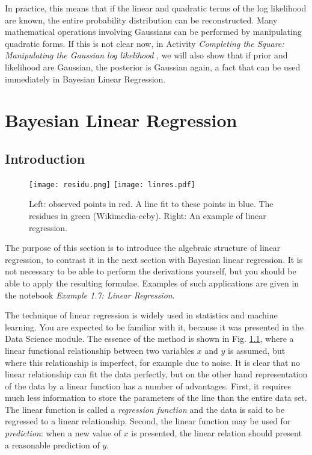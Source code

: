    In practice, this means that if the linear and quadratic terms of the log likelihood
   are known, the entire probability distribution can be reconstructed. Many
   mathematical operations involving Gaussians can be performed by  manipulating
   quadratic forms. If this is not clear now, in Activity \emph{Completing the Square: Manipulating the Gaussian log likelihood },
   we will also show that if prior and likelihood are
   Gaussian, the posterior is Gaussian again, a fact that can be used immediately in
   Bayesian Linear Regression.
  
\chapter{Bayesian Linear Regression}

\section{Introduction}

\begin{figure}
\begin{center}
\texttt{[image: residu.png]}
\texttt{[image: linres.pdf]}
\end{center}
\caption{Left: observed points in red. A line fit to these points in blue. The residues in green (Wikimedia-ccby). Right: An example of linear regression.}
\label{fig-linres}
\end{figure}

The purpose of this section is to introduce the algebraic structure of linear regression, to contrast it in the next section with Bayesian linear regression. It
is not necessary to be able to perform the  derivations yourself, but you should be able to apply the resulting formulae. Examples of such applications are given
in the notebook \emph{Example 1.7: Linear Regression}.


   The technique of linear regression is widely used in statistics and machine learning. You are expected to be familiar with it, because it was presented in the
   Data Science module. The essence of the method is shown in Fig. \ref{fig-linres}, where a linear functional relationship between
   two variables $x$ and $y$ is assumed, but where this relationship is imperfect, for example due to noise. It is clear that no linear relationship can fit the data
   perfectly, but on the other hand representation of the data by a linear function has a number of advantages. First, it requires much less information to store
   the parameters of the line than the entire data set. The linear function is called a \emph{regression function} and the data is said to be regressed to a linear
   relationship. Second, the linear function may be used for \emph{prediction}: when a new value of $x$ is presented, the
   linear relation should present a reasonable prediction of $y$.

